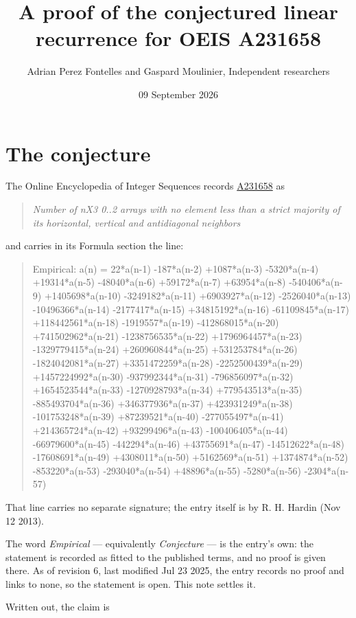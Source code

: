 \documentclass[11pt]{article}
\title{A proof of the conjectured linear recurrence for OEIS A231658}
\author{Adrian Perez Fontelles and Gaspard Moulinier, Independent researchers}
\date{09 September 2026}
\theoremstyle{definition}
\begin{document}
\maketitle
\section{The conjecture}

The Online Encyclopedia of Integer Sequences records \href{https://oeis.org/A231658}{A231658} as

\begin{quote}\itshape Number of nX3 0..2 arrays with no element less than a strict majority of its horizontal, vertical and antidiagonal neighbors\end{quote}

and carries in its Formula section the line:

\begin{quote}\ttfamily Empirical: a(n) = 22*a(n-1) -187*a(n-2) +1087*a(n-3) -5320*a(n-4) +19314*a(n-5) -48040*a(n-6) +59172*a(n-7) +63954*a(n-8) -540406*a(n-9) +1405698*a(n-10) -3249182*a(n-11) +6903927*a(n-12) -2526040*a(n-13) -10496366*a(n-14) -2177417*a(n-15) +34815192*a(n-16) -61109845*a(n-17) +118442561*a(n-18) -1919557*a(n-19) -412868015*a(n-20) +741502962*a(n-21) -1238756535*a(n-22) +1796964457*a(n-23) -1329779415*a(n-24) +260960844*a(n-25) +531253784*a(n-26) -1824042081*a(n-27) +3351472259*a(n-28) -2252500439*a(n-29) +1457224992*a(n-30) -937992344*a(n-31) -796856097*a(n-32) +1654523544*a(n-33) -1270928793*a(n-34) +779543513*a(n-35) -885493704*a(n-36) +346377936*a(n-37) +423931249*a(n-38) -101753248*a(n-39) +87239521*a(n-40) -277055497*a(n-41) +214365724*a(n-42) +93299496*a(n-43) -100406405*a(n-44) -66979600*a(n-45) -442294*a(n-46) +43755691*a(n-47) -14512622*a(n-48) -17608691*a(n-49) +4308011*a(n-50) +5162569*a(n-51) +1374874*a(n-52) -853220*a(n-53) -293040*a(n-54) +48896*a(n-55) -5280*a(n-56) -2304*a(n-57)\end{quote}

That line carries no separate signature; the entry itself is by R. H. Hardin (Nov 12 2013).

The word {\itshape Empirical} --- equivalently {\itshape Conjecture} --- is the entry's own: the statement is recorded as fitted to the published terms, and no proof is given there. As of revision 6, last modified Jul 23 2025, the entry records no proof and links to none, so the statement is open. This note settles it.

Written out, the claim is
\end{document}
